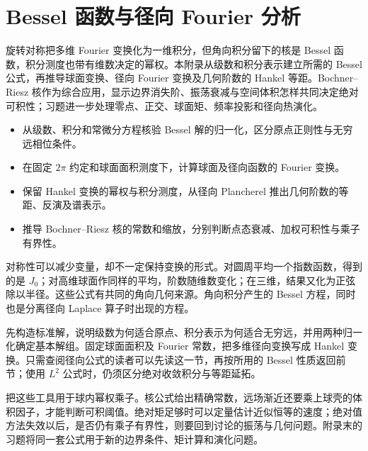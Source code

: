 \chapter{Bessel 函数与径向 Fourier 分析}
\label{b2:app:A}

\begin{chapterabstract}
旋转对称把多维 Fourier 变换化为一维积分，但角向积分留下的核是 Bessel 函数，积分测度也带有维数决定的幂权。本附录从级数和积分表示建立所需的 Bessel 公式，再推导球面变换、径向 Fourier 变换及几何阶数的 Hankel 等距。Bochner--Riesz 核作为综合应用，显示边界消失阶、振荡衰减与空间体积怎样共同决定绝对可积性；习题进一步处理零点、正交、球面矩、频率投影和径向热演化。
\end{chapterabstract}
\begin{learninggoals}
\begin{itemize}
\item\label{b2:item:A2-goal-bessel}从级数、积分和常微分方程核验 Bessel 解的归一化，区分原点正则性与无穷远相位条件。
\item\label{b2:item:A2-goal-radial}在固定 \(2\pi\) 约定和球面面积测度下，计算球面及径向函数的 Fourier 变换。
\item\label{b2:item:A2-goal-hankel}保留 Hankel 变换的幂权与积分测度，从径向 Plancherel 推出几何阶数的等距、反演及谱表示。
\item\label{b2:item:A2-goal-kernel}推导 Bochner--Riesz 核的常数和缩放，分别判断点态衰减、加权可积性与乘子有界性。
\end{itemize}
\end{learninggoals}

对称性可以减少变量，却不一定保持变换的形式。对圆周平均一个指数函数，得到的是 \(J_0\)；对高维球面作同样的平均，阶数随维数变化；在三维，结果又化为正弦除以半径。这些公式有共同的角向几何来源。角向积分产生的 Bessel 方程，同时也是分离径向 Laplace 算子时出现的方程。

\ProseParagraphBreak

先构造标准解，说明级数为何适合原点、积分表示为何适合无穷远，并用两种归一化确定基本解组。固定球面面积及 Fourier 常数，把多维径向变换写成 Hankel 变换。只需查阅径向公式的读者可以先读这一节，再按所用的 Bessel 性质返回前节；使用 \(L^2\) 公式时，仍须区分绝对收敛积分与等距延拓。

\ProseParagraphBreak

把这些工具用于球内幂权乘子。核公式给出精确常数，远场渐近还要乘上球壳的体积因子，才能判断可积阈值。绝对矩足够时可以定量估计近似恒等的速度；绝对值方法失效以后，是否仍有乘子有界性，则要回到讨论的振荡与几何问题。附录末的习题将同一套公式用于新的边界条件、矩计算和演化问题。

